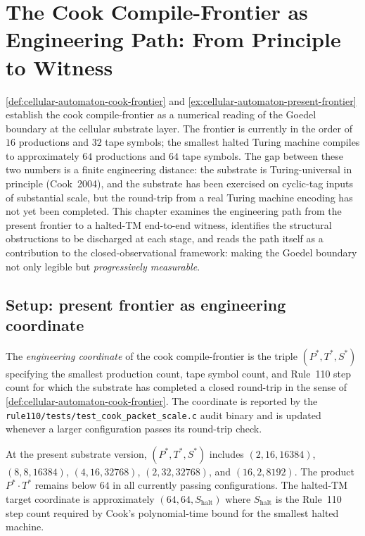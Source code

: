 \chapter{The Cook Compile-Frontier as Engineering Path: From Principle to Witness}
\label{ch:visions-cook-compile-frontier-engineering-path}

\autoref{def:cellular-automaton-cook-frontier} and \autoref{ex:cellular-automaton-present-frontier} establish the cook compile-frontier as a numerical reading of the Goedel boundary at the cellular substrate layer. The frontier is currently in the order of $16$ productions and $32$ tape symbols; the smallest halted Turing machine compiles to approximately $64$ productions and $64$ tape symbols. The gap between these two numbers is a finite engineering distance: the substrate is Turing-universal in principle (Cook~2004), and the substrate has been exercised on cyclic-tag inputs of substantial scale, but the round-trip from a real Turing machine encoding has not yet been completed. This chapter examines the engineering path from the present frontier to a halted-TM end-to-end witness, identifies the structural obstructions to be discharged at each stage, and reads the path itself as a contribution to the closed-observational framework: making the Goedel boundary not only legible but \emph{progressively measurable}.

\section{Setup: present frontier as engineering coordinate}
\label{sec:cook-frontier-setup}

\begin{definition}
\label{def:cook-frontier-engineering-coordinate}
The \emph{engineering coordinate} of the cook compile-frontier is the triple $(P^*, T^*, S^*)$ specifying the smallest production count, tape symbol count, and Rule~110 step count for which the substrate has completed a closed round-trip in the sense of \autoref{def:cellular-automaton-cook-frontier}. The coordinate is reported by the \texttt{rule110/tests/test\_cook\_packet\_scale.c} audit binary and is updated whenever a larger configuration passes its round-trip check.
\end{definition}

\begin{example}
\label{ex:cook-frontier-present-coordinate}
At the present substrate version, $(P^*, T^*, S^*)$ includes $(2, 16, 16384)$, $(8, 8, 16384)$, $(4, 16, 32768)$, $(2, 32, 32768)$, and $(16, 2, 8192)$. The product $P^* \cdot T^*$ remains below $64$ in all currently passing configurations. The halted-TM target coordinate is approximately $(64, 64, S_{\mathrm{halt}})$ where $S_{\mathrm{halt}}$ is the Rule~110 step count required by Cook's polynomial-time bound for the smallest halted machine.
\end{example}

